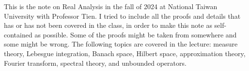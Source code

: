 This is the note on Real Analysis in the fall of 2024 at National Taiwan 
University with Professor Tien. I tried to include all the proofs and 
details that has or has not been covered in the class, in order to make 
this note as self-contained as possible. Some of the proofs might be taken 
from somewhere and some might be wrong. The following topics are covered in 
the lecture: measure theory, Lebesgue integration, Banach space,  
Hilbert space, approximation theory, Fourier transform, spectral theory, 
and unbounded operators.